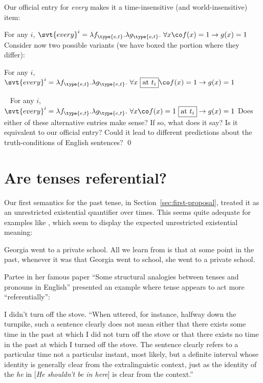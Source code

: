 \clearpage
\begin{exercise}
  Our official entry for \emph{every} makes it a time-insensitive (and
  world-insensitive) item:

  \ex For any $i$,
  $\svt{every}^{i} = \lambda f_{\type{e,t}}.\lambda g_{\type{e,t}}.\ \forall x\co
  f(x)=1 \rightarrow g(x)=1$ \xe
%
  Consider now two possible variants (we have boxed the portion where they
  differ):

  \ex For any $i$,
  $\svt{every}^{i} = \lambda f_{\type{e,t}}.\lambda g_{\type{e,t}}.\ \forall x
  \ \boxed{\text{at}\ t_{i}}\co
  f(x)=1 \rightarrow g(x)=1$ \xe

  \ex~ For any $i$,
  $\svt{every}^{i} = \lambda f_{\type{e,t}}.\lambda g_{\type{e,t}}.\ \forall x\co
  f(x)=1\ \boxed{\text{at}\ t_{i}} \rightarrow g(x)=1$ \xe
  Does either of these alternative entries make sense? If so, what does it say?
  Is it equivalent to our official entry? Could it lead to different predictions
  about the truth-conditions of English sentences? \qed
\end{exercise}

\section{Are tenses referential?}
\label{sec:referential}

Our first semantics for the past tense, in Section~\ref{sec:first-proposal},
treated it as an unrestricted existential quantifier over times. This seems
quite adequate for examples like \Next, which seem to display the expected
unrestricted existential meaning:

\ex Georgia went to a private school.\label{ex:school}\xe
%
All we learn from \Last is that at some point in the past, whenever it was that
Georgia went to school, she went to a private school.

Partee in her famous paper ``Some structural analogies between tenses and
pronouns in English'' \parencite{partee-1973-analogies} presented an example
where tense appears to act more ``referentially'':

\ex I didn’t turn off the stove.\label{ex:stove} \xe
%
``When uttered, for instance, halfway down the turnpike, such a sentence clearly
does not mean either that there exists some time in the past at which I did not
turn off the stove or that there exists no time in the past at which I turned
off the stove. The sentence clearly refers to a particular time \dash not a
particular instant, most likely, but a definite interval whose identity is
generally clear from the extralinguistic context, just as the identity of the
\emph{he} in [\emph{He shouldn’t be in here}] is clear from the context.''

